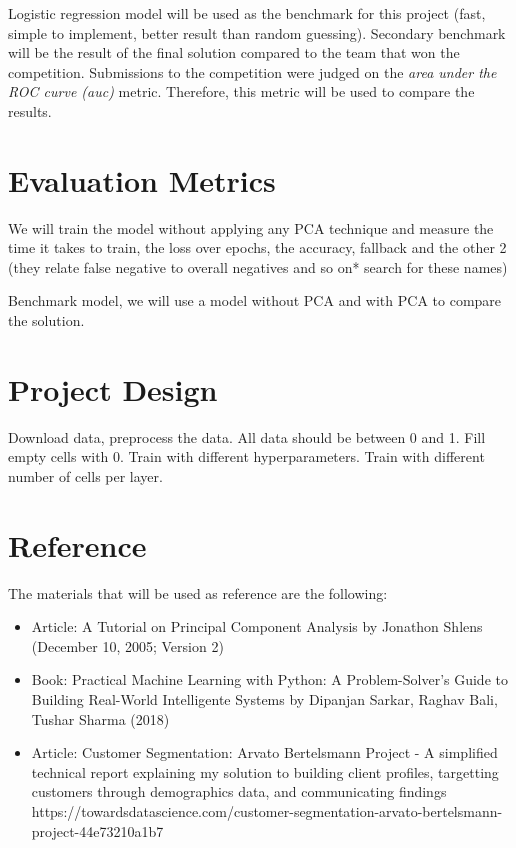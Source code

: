 Logistic regression model will be used as the benchmark for this project
(fast, simple to implement, better result than random guessing).
Secondary benchmark will be the result of the final solution compared to
the team that won the competition. Submissions to the competition were
judged on the \emph{area under the ROC curve (auc)} metric. Therefore,
this metric will be used to compare the results.

\hypertarget{evaluation-metrics}{%
\section{Evaluation Metrics}\label{evaluation-metrics}}

We will train the model without applying any PCA technique and measure
the time it takes to train, the loss over epochs, the accuracy, fallback
and the other 2 (they relate false negative to overall negatives and so
on* search for these names)

Benchmark model, we will use a model without PCA and with PCA to compare
the solution.

\hypertarget{project-design}{%
\section{Project Design}\label{project-design}}

Download data, preprocess the data. All data should be between 0 and 1.
Fill empty cells with 0. Train with different hyperparameters. Train
with different number of cells per layer.

\hypertarget{reference}{%
\section{Reference}\label{reference}}

The materials that will be used as reference are the following:

\begin{itemize}
\item
  Article: A Tutorial on Principal Component Analysis by Jonathon Shlens
  (December 10, 2005; Version 2)
\item
  Book: Practical Machine Learning with Python: A Problem-Solver's Guide
  to Building Real-World Intelligente Systems by Dipanjan Sarkar, Raghav
  Bali, Tushar Sharma (2018)
\item
  Article: Customer Segmentation: Arvato Bertelsmann Project - A
  simplified technical report explaining my solution to building client
  profiles, targetting customers through demographics data, and
  communicating findings
  https://towardsdatascience.com/customer-segmentation-arvato-bertelsmann-project-44e73210a1b7
\end{itemize}

